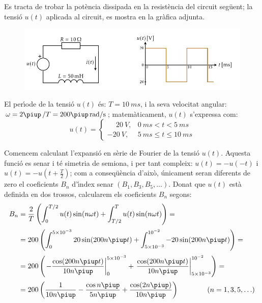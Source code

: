 \vspace{2mm}
\begin{exemple}
 Es tracta de trobar la pot\`{e}ncia
 dissipada en la resist\`{e}ncia del circuit seg\"{u}ent; la tensi\'{o} $u(t)$ aplicada al circuit,
 es mostra en la gr\`{a}fica adjunta.

\begin{figure}[h]
\centering
    \includegraphics{Imatges/Cap-Fourier-Exemple-Circuit.pdf}
\end{figure}

 El per\'{\i}ode de la tensi\'{o} $u(t)$ \'{e}s: $T=\SI{10}{ms}$, i la
seva velocitat angular: $\omega = 2\piup\,/T = 200\piup\unit{rad/s}$;
matem\`{a}ticament, $u(t)$ s'expressa com:
\[
u(t) = \begin{cases} \phantom{-}\SI{20}{V}, & \SI{0}{ms} < t < \SI{5}{ms} \\
       \SI{-20}{V}, & \SI{5}{ms} \leq t \leq \SI{10}{ms} \end{cases}
\]

Comencem calculant l'expansi\'{o} en s\`{e}rie de Fourier de la tensi\'{o}
$u(t)$. Aquesta funci\'{o} es senar i t\'{e} simetria de semiona, i per tant
 compleix: $u(t)=-u(-t)$ i $u(t) = -u(t+\frac{T}{2})$; com a
conseq\"{u}\`{e}ncia d'aix\`{o}, \'{u}nicament seran diferents de zero el
coeficients $B_n$ d'\'{\i}ndex senar $(B_1,B_3,B_5,\ldots)$. Donat que
$u(t)$ est\`{a} definida en dos trossos, calcularem els coeficients
$B_n$ segons:
\[
\begin{split}
    B_n &= \frac{2}{T} \left( \int_0^{T/2} u(t) \sin(n \omega t) +
    \int_{T/2}^{T} u(t) \sin(n \omega t) \right) =\\[0.5ex]
    &= 200 \left( \int_0^{5\times 10^{-3}} 20 \sin(200 n \piup t) +
    \int_{5\times 10^{-3}}^{10^{-2}} -20 \sin(200 n \piup t) \right) =\\[0.5ex]
    &= 200 \left( \left. -\frac{\cos(200 n \piup t)}{10 n \piup}\right|_0^{5\times 10^{-3}}
    +  \left.\frac{\cos(200 n \piup t)}{10 n \piup}\right|_{5\times
    10^{-3}}^{10^{-2}}\right)=\\[0.5ex]
    &= 200\left( \frac{1}{10 n \piup} - \frac{\cos n \piup}{5 n \piup} +
    \frac{\cos (2 n \piup)}{10 n \piup}\right)
    \qquad\qquad(n=1,3,5,\ldots)
\end{split}
\]


\end{exemple}
